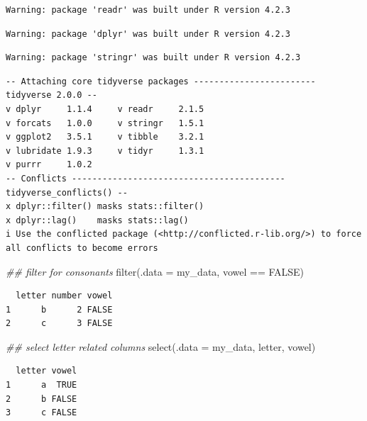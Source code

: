 \documentclass[
  letterpaper,
  DIV=11,
  numbers=noendperiod]{scrreprt}
\newenvironment{Shaded}{\begin{snugshade}}{\end{snugshade}}
\newcommand{\AttributeTok}[1]{\textcolor[rgb]{0.40,0.45,0.13}{#1}}
\newcommand{\ConstantTok}[1]{\textcolor[rgb]{0.56,0.35,0.01}{#1}}
\newcommand{\DocumentationTok}[1]{\textcolor[rgb]{0.37,0.37,0.37}{\textit{#1}}}
\newcommand{\FunctionTok}[1]{\textcolor[rgb]{0.28,0.35,0.67}{#1}}
\newcommand{\NormalTok}[1]{\textcolor[rgb]{0.00,0.23,0.31}{#1}}
\newcommand{\SpecialCharTok}[1]{\textcolor[rgb]{0.37,0.37,0.37}{#1}}
\begin{document}
\begin{verbatim}
Warning: package 'readr' was built under R version 4.2.3
\end{verbatim}

\begin{verbatim}
Warning: package 'dplyr' was built under R version 4.2.3
\end{verbatim}

\begin{verbatim}
Warning: package 'stringr' was built under R version 4.2.3
\end{verbatim}

\begin{verbatim}
-- Attaching core tidyverse packages ------------------------ tidyverse 2.0.0 --
v dplyr     1.1.4     v readr     2.1.5
v forcats   1.0.0     v stringr   1.5.1
v ggplot2   3.5.1     v tibble    3.2.1
v lubridate 1.9.3     v tidyr     1.3.1
v purrr     1.0.2     
-- Conflicts ------------------------------------------ tidyverse_conflicts() --
x dplyr::filter() masks stats::filter()
x dplyr::lag()    masks stats::lag()
i Use the conflicted package (<http://conflicted.r-lib.org/>) to force all conflicts to become errors
\end{verbatim}

\begin{Shaded}
\begin{Highlighting}[]
\DocumentationTok{\#\# filter for consonants}
\FunctionTok{filter}\NormalTok{(}\AttributeTok{.data =}\NormalTok{ my\_data, vowel }\SpecialCharTok{==} \ConstantTok{FALSE}\NormalTok{)}
\end{Highlighting}
\end{Shaded}

\begin{verbatim}
  letter number vowel
1      b      2 FALSE
2      c      3 FALSE
\end{verbatim}

\begin{Shaded}
\begin{Highlighting}[]
\DocumentationTok{\#\# select letter related columns}
\FunctionTok{select}\NormalTok{(}\AttributeTok{.data =}\NormalTok{ my\_data, letter, vowel)}
\end{Highlighting}
\end{Shaded}

\begin{verbatim}
  letter vowel
1      a  TRUE
2      b FALSE
3      c FALSE
\end{verbatim}
\end{document}
